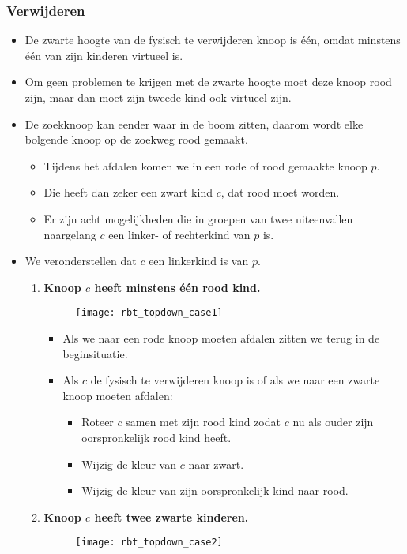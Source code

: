 \subsubsection{Verwijderen}
\begin{itemize}
    \item De zwarte hoogte van de fysisch te verwijderen knoop is één, omdat minstens één van zijn kinderen virtueel is.
    \item Om geen problemen te krijgen met de zwarte hoogte moet deze knoop rood zijn, maar dan moet zijn tweede kind ook virtueel zijn.
    \item De zoekknoop kan eender waar in de boom zitten, daarom wordt elke bolgende knoop op de zoekweg rood gemaakt.
    \begin{itemize}
        \item Tijdens het afdalen komen we in een rode of rood gemaakte knoop $p$.
        \item Die heeft dan zeker een zwart kind $c$, dat rood moet worden.
        \item Er zijn acht mogelijkheden die in groepen van twee uiteenvallen naargelang $c$ een linker- of rechterkind van $p$ is.
    \end{itemize}
    \item We veronderstellen dat $c$ een linkerkind is van $p$.
    \begin{enumerate}
        \item \textbf{Knoop $c$ heeft minstens één rood kind.}
        \begin{figure}[ht]
            \centering
            \texttt{[image: rbt\_topdown\_case1]}
            \caption{}
            \label{fig:rbt_topdown_case1}
        \end{figure}
        \begin{itemize}
            \item Als we naar een rode knoop moeten afdalen zitten we terug in de beginsituatie.
            \item Als $c$ de fysisch te verwijderen knoop is of als we naar een zwarte knoop moeten afdalen:
            \begin{itemize}
                \item Roteer $c$ samen met zijn rood kind zodat $c$ nu als ouder zijn oorspronkelijk rood kind heeft.
                \item Wijzig de kleur van $c$ naar zwart.
                \item Wijzig de kleur van zijn oorspronkelijk kind naar rood.
            \end{itemize}
        \end{itemize}
        \item \textbf{Knoop $c$ heeft twee zwarte kinderen.}
        \begin{figure}[ht]
            \centering
            \texttt{[image: rbt\_topdown\_case2]}
            \caption{}
            \label{fig:rbt_topdown_case2}
        \end{figure}
        
    \end{enumerate}

\end{itemize}


